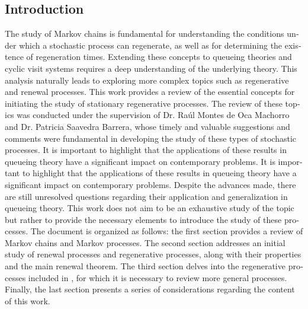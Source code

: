 \documentclass{article}
\renewcommand{\abstractname}{Resumen}
\numberwithin{equation}{section}
\begin{document}
\begin{otherlanguage}{english}
\section*{Introduction}

The study of Markov chains is fundamental for understanding the conditions under which a stochastic process can regenerate, as well as for determining the existence of regeneration times. Extending these concepts to queueing theories and cyclic visit systems requires a deep understanding of the underlying theory. This analysis naturally leads to exploring more complex topics such as regenerative and renewal processes. This work provides a review of the essential concepts for initiating the study of stationary regenerative processes. The review of these topics was conducted under the supervision of Dr. Raúl Montes de Oca Machorro and Dr. Patricia Saavedra Barrera, whose timely and valuable suggestions and comments were fundamental in developing the study of these types of stochastic processes. It is important to highlight that the applications of these results in queueing theory have a significant impact on contemporary problems. It is important to highlight that the applications of these results in queueing theory have a significant impact on contemporary problems. Despite the advances made, there are still unresolved questions regarding their application and generalization in queueing theory. This work does not aim to be an exhaustive study of the topic but rather to provide the necessary elements to introduce the study of these processes. The document is organized as follows: the first section provides a review of Markov chains and Markov processes. The second section addresses an initial study of renewal processes and regenerative processes, along with their properties and the main renewal theorem. The third section delves into the regenerative processes included in \cite{Thorisson}, for which it is necessary to review more general processes. Finally, the last section presents a series of considerations regarding the content of this work.

\end{otherlanguage}
\end{document}
